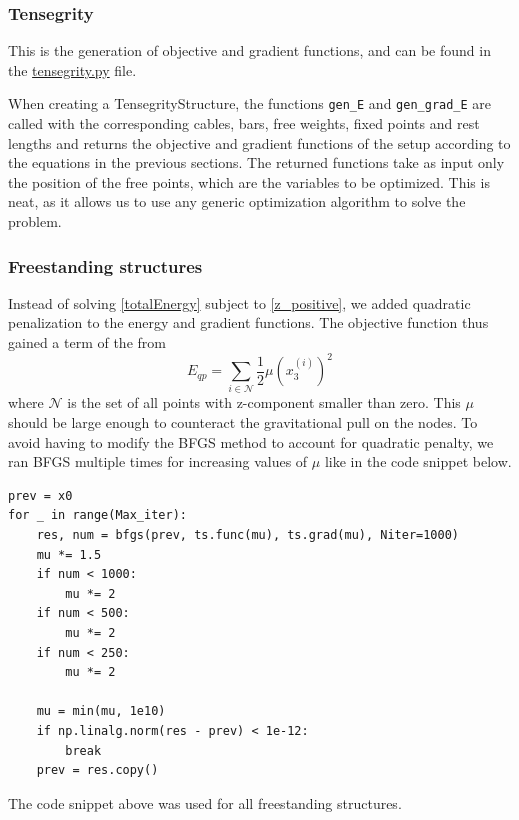 \subsubsection{Tensegrity}
This is the generation of objective and gradient functions, and can be found in the \href{https://github.com/otkulseng/Opt1_Project/blob/main/Kode/tensegrity.py}{tensegrity.py} file. 

When creating a TensegrityStructure, the functions \lstinline{gen_E}  and \lstinline{gen_grad_E} are called with the corresponding cables, bars, free weights, fixed points and rest lengths and returns the objective and gradient functions of the setup according to the equations in the previous sections. The returned functions take as input only the position of the free points, which are the variables to be optimized. This is neat, as it allows us to use any generic optimization algorithm to solve the problem.

\subsubsection{Freestanding structures}
Instead of solving \eqref{totalEnergy} subject to \eqref{z_positive}, we added quadratic penalization to the energy and gradient functions. The objective function thus gained a term of the from 
\begin{equation}
    E_{qp} = \sum_{i \in \mathcal{N}} \frac{1}{2} \mu (x_3^{(i)})^2
    \label{eq:quadraticpenalty}
\end{equation}
where $\mathcal{N}$ is the set of all points with z-component smaller than zero. This $\mu$ should be large enough to counteract the gravitational pull on the nodes. To avoid having to modify the BFGS method to account for quadratic penalty, we ran BFGS multiple times for increasing values of $\mu$ like in the code snippet below.
\begin{lstlisting}
prev = x0
for _ in range(Max_iter):
    res, num = bfgs(prev, ts.func(mu), ts.grad(mu), Niter=1000)
    mu *= 1.5
    if num < 1000:
        mu *= 2
    if num < 500:
        mu *= 2
    if num < 250:
        mu *= 2

    mu = min(mu, 1e10)
    if np.linalg.norm(res - prev) < 1e-12:
        break
    prev = res.copy()
\end{lstlisting}
The code snippet above was used for all freestanding structures.

